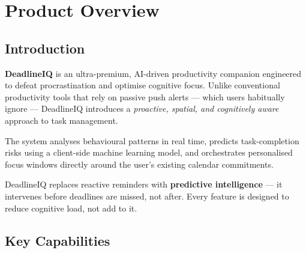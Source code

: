 \documentclass[12pt,a4paper]{report}
\begin{document}
\tableofcontents
\newpage

\chapter{Product Overview}
\label{ch:overview}

\section{Introduction}

\textbf{DeadlineIQ} is an ultra-premium, AI-driven productivity companion engineered to defeat procrastination and optimise cognitive focus. Unlike conventional productivity tools that rely on passive push alerts — which users habitually ignore — DeadlineIQ introduces a \textit{proactive, spatial, and cognitively aware} approach to task management.

The system analyses behavioural patterns in real time, predicts task-completion risks using a client-side machine learning model, and orchestrates personalised focus windows directly around the user's existing calendar commitments.

\begin{tcolorbox}[infobox, title={Core Value Proposition}]
DeadlineIQ replaces reactive reminders with \textbf{predictive intelligence} — it intervenes before deadlines are missed, not after. Every feature is designed to reduce cognitive load, not add to it.
\end{tcolorbox}

\section{Key Capabilities}
\end{document}
